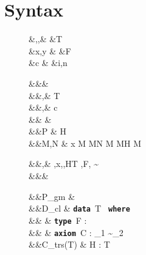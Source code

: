 \documentclass[screen,nonacm,manuscript,review]{acmart} %
\begin{document}
\section{Syntax}\label{sec:sfc-syntax}
\begin{figure}[ht]
 \centering
 \begin{syntax}
  &\TyVar,\beta,\Co &\qquad{} &T \\
  &x,y &\qquad{} &F\\
  &c &\qquad{} &i,n \in {}
 \end{syntax}
 \begin{syntax}
  &&\kappa \bnfeq& \star \bnfor \kappa \to \kappa \bnfor \shl{\sigma \sim \tau}\\
  &&\tau,\sigma \bnfeq& \TyVar \bnfor T \bnfor \tau \to \tau \bnfor \tau\App\tau \bnfor \Forall {\TyVar\co\kappa} \tau \bnfor {} \bnfor \shl{\Co}\\
  &&\nu,\Co \bnfeq& c \bnfor \Refl\tau \bnfor \Sym\Co \bnfor \Trans\nu\Co %
 \bnfor \Forall {\TyVar\co\kappa} \Co \bnfor \Co\At\tau %
 \bnfor \nu\App\Co \bnfor \Left \Co \bnfor \Right \Co\\  %
  && \phi \bnfeq& \tau \bnfor \Co\\
  &&P \bnfeq& H\App \many{\TyVar\co\kappa} \\
  &&M,N \bnfeq& x \bnfor {} M \bnfor M\App N \bnfor \TLam{\phi\co\kappa} M \bnfor M\App \tau \bnfor H \bnfor \Case M  \bnfor \shl{\Cast \Tm \Co}\\

 \end{syntax}
 \begin{syntax}
  &&\TEnv,\Delta \bnfeq& \empt \bnfor \TEnv,x\co\tau \bnfor \TEnv,\TyVar\co\kappa \bnfor \TEnv,H\co T \bnfor \TEnv,F\co\tau \bnfor \TEnv, \Co \co \tau\sim\sigma\\
  &&\Subst \bnfeq& \empt \bnfor \Set{\many{\TyVar \mapsto \tau}}
 \end{syntax}

 \begin{syntax}
  &&P_{gm} \bnfeq&  \mathrel{;} \\
  &&D_{cl} \bnfeq& \textbf{\texttt{data }}\App T\co\many{\kappa} \to \star\App \textbf{\texttt{ where }}\App {} \\
 && \bnfor& \textbf{\texttt{type }}\App F : \many\kappa \to \kappa\\
 && \bnfor& \textbf{\texttt{axiom }}\App C\App \many{\TyVar\co\kappa} : \sigma_1 \sim \sigma_2\\
  &&C_{trs}(T) \bnfeq& H : \Forall {\many{\TyVar\co\kappa}} { \many\sigma \to T\many\TyVar}\\
 \end{syntax}


\end{figure}
\end{document}
